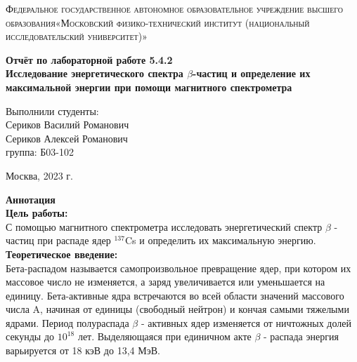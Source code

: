 \documentclass[a4paper, 12pt]{article}%
\begin{document}
	\begin{titlepage}
		\begin{center}
			\textsc{Федеральное государственное автономное образовательное учреждение высшего образования«Московский физико-технический институт (национальный исследовательский университет)»\\[5mm]
			}
			
			\vfill
			
			\textbf{Отчёт по лабораторной работе 5.4.2\\[3mm]
				Исследование энергетического спектра $\beta$-частиц
				и определение их максимальной энергии при помощи
				магнитного спектрометра
				\\[50mm]
			}
			
		\end{center}
		
		\hfill
		\begin{minipage}{.5\textwidth}
			Выполнили студенты:\\[2mm]
			Сериков Василий Романович\\[2mm]
			Сериков Алексей Романович\\[2mm]
			группа: Б03-102\\[5mm]
			
		\end{minipage}
		\vfill
		\begin{center}
			Москва, 2023 г.
		\end{center}
		
	\end{titlepage}
	
	\newpage
	\setcounter{page}{2}
	\textbf{Аннотация}\\
	
	\textbf{Цель работы: }\\
	
	 С помощью магнитного спектрометра исследовать энергетический спектр $\beta$ - частиц при распаде ядер $^{137}$Cs  и определить их максимальную энергию.\\ 
	
	\textbf{Теоретическое введение: }\\
	
	Бета-распадом называется самопроизвольное превращение ядер, при котором их массовое число не изменяется, а заряд увеличивается или уменьшается на единицу. Бета-активные ядра встречаются во всей области значений массового числа A, начиная от единицы (свободный нейтрон) и кончая самыми тяжелыми ядрами. Период полураспада $\beta$ - активных ядер изменяется от ничтожных долей секунды до $10^{18}$ лет. Выделяющаяся при единичном акте $\beta$ - распада энергия варьируется от 18 кэВ до 13,4 МэВ.
	
\end{document}
